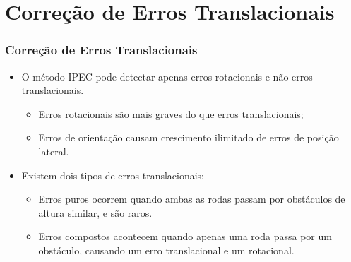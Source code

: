 \documentclass[xcolor=dvipsnames, aspectratio=169]{beamer}
\begin{document}
\section{Correção de Erros Translacionais}
\begin{frame}
  \frametitle{Correção de Erros Translacionais}
  \begin{itemize}
    \item O método IPEC pode detectar apenas erros rotacionais e não erros translacionais. 
    \begin{itemize}
      \item Erros rotacionais são mais graves do que erros translacionais;
      \item Erros de orientação causam crescimento ilimitado de erros de posição lateral.
    \end{itemize}
        
    \item Existem dois tipos de erros translacionais: 
    \begin{itemize}
      \item Erros puros ocorrem quando ambas as rodas passam por obstáculos de altura similar, e são raros. 
      \item Erros compostos acontecem quando apenas uma roda passa por um obstáculo, causando um erro translacional e um rotacional.
    \end{itemize}
        

\end{itemize}
\end{frame}
\end{document}
